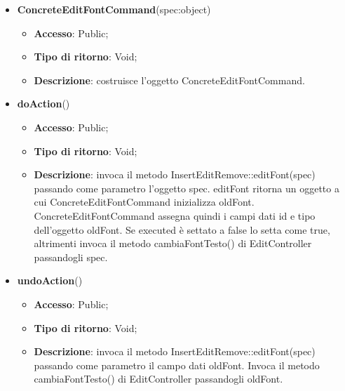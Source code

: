{{{\begin{itemize}
\begin{itemize}
\begin{itemize}
\begin{itemize}
				\end{itemize}
			\end{itemize}
				\end{itemize}
				\end{itemize}
			\begin{itemize}
				\item \textbf{ConcreteEditFontCommand}(spec:object)
				\begin{itemize}
					\item \textbf{Accesso}: Public;
					\item \textbf{Tipo di ritorno}: Void;
					\item \textbf{Descrizione}: costruisce l’oggetto ConcreteEditFontCommand.
				\end{itemize}
				\item \textbf{doAction}()
				\begin{itemize}
					\item \textbf{Accesso}: Public;
					\item \textbf{Tipo di ritorno}: Void;
					\item \textbf{Descrizione}: invoca il metodo InsertEditRemove::editFont(spec) passando come parametro l'oggetto spec. editFont ritorna un oggetto a cui ConcreteEditFontCommand inizializza oldFont. ConcreteEditFontCommand assegna quindi i campi dati id e tipo dell'oggetto oldFont. Se executed è settato a false lo setta come true, altrimenti invoca il metodo cambiaFontTesto() di EditController passandogli spec.
				\end{itemize}
				\item \textbf{undoAction}()
				\begin{itemize}
					\item \textbf{Accesso}: Public;
					\item \textbf{Tipo di ritorno}: Void;
					\item \textbf{Descrizione}: invoca il metodo InsertEditRemove::editFont(spec) passando come parametro il campo dati oldFont. Invoca il metodo cambiaFontTesto() di EditController passandogli oldFont.
				\end{itemize}
			\end{itemize}
	}

}}
